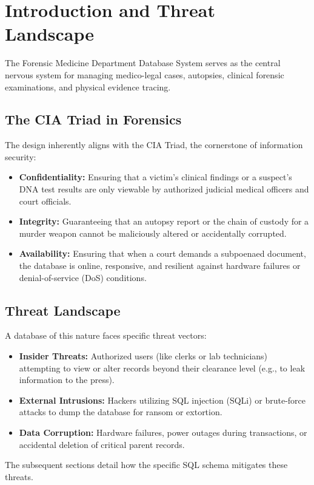 \documentclass[12pt,a4paper]{article}
\begin{document}
\section{Introduction and Threat Landscape}
The Forensic Medicine Department Database System serves as the central nervous system for managing medico-legal cases, autopsies, clinical forensic examinations, and physical evidence tracing. 

\subsection{The CIA Triad in Forensics}
The design inherently aligns with the CIA Triad, the cornerstone of information security:
\begin{itemize}
    \item \textbf{Confidentiality:} Ensuring that a victim's clinical findings or a suspect's DNA test results are only viewable by authorized judicial medical officers and court officials.
    \item \textbf{Integrity:} Guaranteeing that an autopsy report or the chain of custody for a murder weapon cannot be maliciously altered or accidentally corrupted.
    \item \textbf{Availability:} Ensuring that when a court demands a subpoenaed document, the database is online, responsive, and resilient against hardware failures or denial-of-service (DoS) conditions.
\end{itemize}

\subsection{Threat Landscape}
A database of this nature faces specific threat vectors:
\begin{itemize}
    \item \textbf{Insider Threats:} Authorized users (like clerks or lab technicians) attempting to view or alter records beyond their clearance level (e.g., to leak information to the press).
    \item \textbf{External Intrusions:} Hackers utilizing SQL injection (SQLi) or brute-force attacks to dump the database for ransom or extortion.
    \item \textbf{Data Corruption:} Hardware failures, power outages during transactions, or accidental deletion of critical parent records.
\end{itemize}
The subsequent sections detail how the specific SQL schema mitigates these threats.
\end{document}
